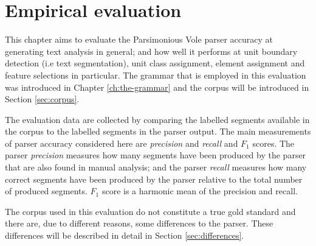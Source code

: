 \chapter{Empirical evaluation}



    This chapter aims to evaluate the Parsimonious Vole parser accuracy at generating text analysis in general; and how well it performs at unit boundary detection (i.e text segmentation), unit class assignment, element assignment and feature selections in particular. The grammar that is employed in this evaluation was introduced in Chapter \ref{ch:the-grammar} and the corpus will be introduced in Section \ref{sec:corpus}. 
    
    The evaluation data are collected by comparing the labelled segments  available in the corpus to the labelled segments in the parser output. The main measurements of parser accuracy considered here are \textit{precision} and \textit{recall} and $F_1$ scores. The parser \textit{precision} measures how many segments have been produced by the parser that are also found in manual analysis; and the parser \textit{recall} measures how many correct segments have been produced by the parser relative to the total number of produced segments. $F_1$ score is a harmonic mean of the precision and recall.
    
    The corpus used in this evaluation do not constitute a true gold standard and there are, due to different reasons, some differences to the parser. These differences will be described in detail in Section \ref{sec:differences}.
    
